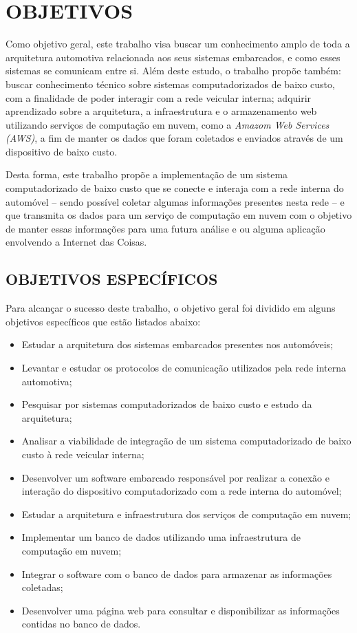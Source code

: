 \chapter{OBJETIVOS}\label{CAP3}

Como objetivo geral, este trabalho visa buscar um conhecimento amplo de toda a arquitetura automotiva relacionada aos seus sistemas embarcados, e como esses sistemas se comunicam entre si. Além deste estudo, o trabalho propõe também: buscar conhecimento técnico sobre sistemas computadorizados de baixo custo, com a finalidade de poder interagir com a rede veicular interna; adquirir aprendizado sobre a arquitetura, a infraestrutura e o armazenamento web utilizando serviços de computação em nuvem, como a \textit{Amazom Web Services (AWS)}, a fim de manter os dados que foram coletados e enviados através de um dispositivo de baixo custo.

Desta forma, este trabalho propõe a implementação de um sistema computadorizado de baixo custo que se conecte e interaja com a rede interna do automóvel – sendo possível coletar algumas informações presentes nesta rede – e que transmita os dados para um serviço de computação em nuvem com o objetivo de manter essas informações para uma futura análise e ou alguma aplicação envolvendo a Internet das Coisas.

\section{OBJETIVOS ESPECÍFICOS}
Para alcançar o sucesso deste trabalho, o objetivo geral foi dividido em alguns objetivos específicos que estão listados abaixo:
\begin{itemize}
\item Estudar a arquitetura dos sistemas embarcados presentes nos automóveis;
\item Levantar e estudar os protocolos de comunicação utilizados pela rede interna automotiva;
\item Pesquisar por sistemas computadorizados de baixo custo e estudo da arquitetura;
\item Analisar a viabilidade de integração de um sistema computadorizado de baixo custo à rede veicular interna;
\item Desenvolver um software embarcado responsável por realizar a conexão e interação do dispositivo computadorizado com a rede interna do automóvel;
\item Estudar a arquitetura e infraestrutura dos serviços de computação em nuvem;
\item Implementar um banco de dados utilizando uma infraestrutura de computação em nuvem;
\item Integrar o software com o banco de dados para armazenar as informações coletadas;
\item Desenvolver uma página web para consultar e disponibilizar as informações contidas no banco de dados.
\end{itemize}

